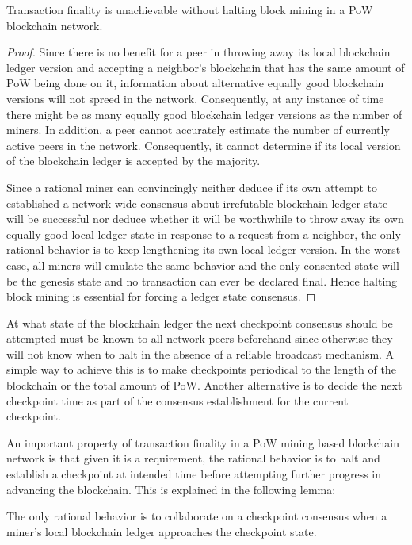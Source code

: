 \begin{lemma}
\label{l-halt}
Transaction finality is unachievable without halting block mining in a PoW blockchain network.  
\end{lemma}

\begin{proof}
Since there is no benefit for a peer in throwing away its local blockchain ledger version and accepting a neighbor's blockchain that has the same amount of PoW being done on it, information about alternative equally good blockchain versions will not spreed in the network. Consequently, at any instance of time there might be as many equally good blockchain ledger versions as the number of miners. In addition, a peer cannot accurately estimate the number of currently active peers in the network. Consequently, it cannot determine if its local version of the blockchain ledger is accepted by the majority. 

Since a rational miner can convincingly neither deduce if its own attempt to established a network-wide consensus about irrefutable blockchain ledger state will be successful nor deduce whether it will be worthwhile to throw away its own equally good local ledger state in response to a request from a neighbor, the only rational behavior is to keep lengthening its own local ledger version. In the worst case, all miners will emulate the same behavior and the only consented state will be the genesis state and no transaction can ever be declared final. Hence halting block mining is essential for forcing a ledger state consensus.             
\end{proof}                

At what state of the blockchain ledger the next checkpoint consensus should be attempted must be known to all network peers beforehand since otherwise they will not know when to halt in the absence of a reliable broadcast mechanism. A simple way to achieve this is to make checkpoints periodical to the length of the blockchain or the total amount of PoW. Another alternative is to decide the next checkpoint time as part of the consensus establishment for the current checkpoint.    

An important property of transaction finality in a PoW mining based blockchain network is that given it is a requirement, the rational behavior is to halt and establish a checkpoint at intended time before attempting further progress in advancing the blockchain. This is explained in the following lemma:

\begin{lemma}
\label{l-rationality}
The only rational behavior is to collaborate on a checkpoint consensus when a miner's local blockchain ledger approaches the checkpoint state.       
\end{lemma}

